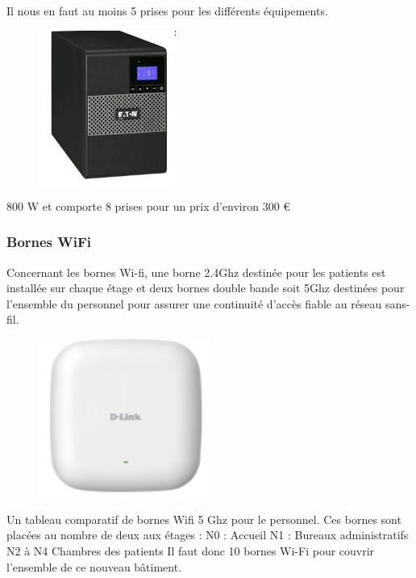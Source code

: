 Il nous en faut au moins 5 prises pour les différents équipements.

\begin{figure}[!ht]
    \center
    \includegraphics[width=0.4\textwidth]{./images/18.png}
\end{figure}

800 W et comporte 8 prises pour un prix d'environ 300  \euro



\subsubsection{Bornes WiFi}

Concernant les bornes Wi-fi, une borne 2.4Ghz destinée pour les patients est installée sur chaque étage et deux bornes double bande soit 5Ghz destinées pour l'ensemble du personnel pour assurer une continuité d'accès fiable au réseau sans-fil.

\begin{figure}[!ht]
    \center
    \includegraphics[width=0.5\textwidth]{./images/20.png}
\end{figure}

Un tableau comparatif de bornes Wifi 5 Ghz pour le personnel. Ces bornes sont placées au nombre de deux aux étages :
N0 : Accueil
N1 : Bureaux administratifs
N2 à N4  Chambres des patients
Il faut donc 10 bornes Wi-Fi pour couvrir l'ensemble de ce nouveau bâtiment.



